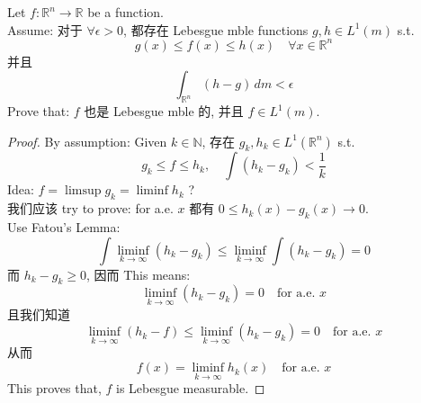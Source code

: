 \documentclass[lang=cn,11pt]{elegantbook}
\begin{document}
\begin{example}
    Let $f: \mathbb{R}^n \to \mathbb{R}$ be a function.\\
    Assume: 对于 $\forall \epsilon > 0$, 都存在 Lebesgue mble functions $g,h\in L^1 (m)$  s.t. \[
    g(x) \leq f(x) \leq h(x) \quad \forall x \in \mathbb{R}^n
    \]并且 \[
    \int_{\mathbb{R}^n} (h-g) \, dm < \epsilon 
    \]
    Prove that: $f$ 也是 Lebesgue mble 的, 并且 $f\in L^1(m)$.\\
   \begin{proof}
By assumption: Given $k \in \mathbb{N}$, 存在 $g_k,h_k \in L^1(\mathbb{R}^n)$ s.t.  \[   g_k \leq f \leq h_k ,\quad \int (h_k - g_k) < \frac{1}{k}\]
Idea: $f = \limsup g_k = \liminf h_k$ ? \\
我们应该 try to prove: for a.e. $x$ 都有 $ 0\leq h_k(x) - g_k (x) \to 0$.\\
Use Fatou's Lemma: \[
\int \liminf_{k\to \infty} (h_k - g_k) \leq \liminf_{k\to \infty} \int (h_k - g_k)  = 0
\]而 $h_k - g_k \geq 0$, 因而 This means: \[
 \liminf_{k\to \infty} (h_k - g_k) = 0\quad \text{for a.e. } x
\]
且我们知道\[
\liminf_{k\to \infty} (h_k - f)\leq \liminf_{k\to \infty}  (h_k - g_k) = 0\quad \text{for a.e. } x
\]
从而 \[
f(x) = \liminf_{k\to \infty} h_k(x) \quad \text{for a.e. } x
\]
This proves that, $f$ is Lebesgue measurable.
   
   \end{proof}
\end{example}
\end{document}
